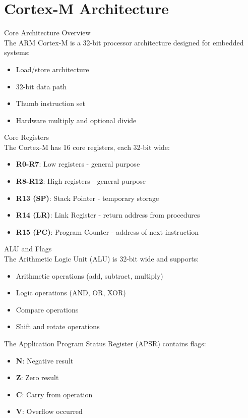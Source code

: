 \section{Cortex-M Architecture}

\begin{concept}{Core Architecture Overview}\\
The ARM Cortex-M is a 32-bit processor architecture designed for embedded systems:
\begin{itemize}
  \item Load/store architecture
  \item 32-bit data path
  \item Thumb instruction set
  \item Hardware multiply and optional divide
\end{itemize}
\end{concept}

\begin{definition}{Core Registers}\\
The Cortex-M has 16 core registers, each 32-bit wide:
\begin{itemize}
  \item \textbf{R0-R7}: Low registers - general purpose
  \item \textbf{R8-R12}: High registers - general purpose
  \item \textbf{R13 (SP)}: Stack Pointer - temporary storage
  \item \textbf{R14 (LR)}: Link Register - return address from procedures
  \item \textbf{R15 (PC)}: Program Counter - address of next instruction
\end{itemize}
\end{definition}

\begin{definition}{ALU and Flags}\\
The Arithmetic Logic Unit (ALU) is 32-bit wide and supports:
\begin{itemize}
  \item Arithmetic operations (add, subtract, multiply)
  \item Logic operations (AND, OR, XOR)
  \item Compare operations
  \item Shift and rotate operations
\end{itemize}

The Application Program Status Register (APSR) contains flags:
\begin{itemize}
  \item \textbf{N}: Negative result
  \item \textbf{Z}: Zero result
  \item \textbf{C}: Carry from operation
  \item \textbf{V}: Overflow occurred
\end{itemize}
\end{definition}

